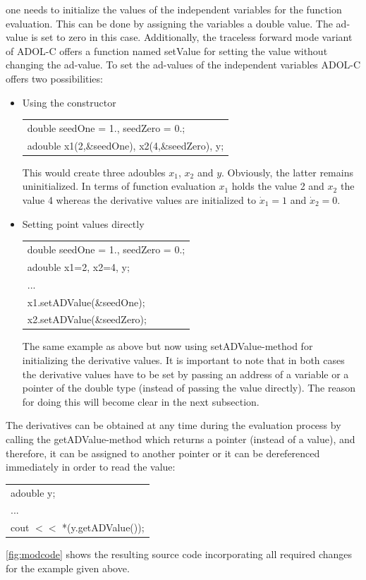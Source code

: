 \documentclass[11pt,twoside]{article}
\begin{document}
one needs to initialize the values of the independent variables for the
function evaluation. This can be done by assigning the variables a {\sf
double} value. The {\sf ad}-value is set to zero in this case. 
Additionally, the traceless forward mode variant of ADOL-C
offers a function named {\sf setValue} for setting the value without
changing the {\sf ad}-value. To set the {\sf ad}-values of the independent
variables ADOL-C offers two possibilities:
\begin{itemize}
  \item Using the constructor
        \begin{center}
	  \begin{tabular}{l}
        {\sf double seedOne = 1., seedZero = 0.;}\\
	    {\sf adouble x1(2,\&seedOne), x2(4,\&seedZero), y;}
	  \end{tabular}
	\end{center}
	This would create three adoubles $x_1$, $x_2$ and $y$. Obviously, the latter
	remains uninitialized. In terms of function evaluation
	$x_1$ holds the value 2 and $x_2$ the value 4 whereas the derivative values
	are initialized to $\dot{x}_1=1$ and $\dot{x}_2=0$.
   \item Setting point values directly
         \begin{center}
	   \begin{tabular}{l}
         {\sf double seedOne = 1., seedZero = 0.;}\\
	     {\sf adouble x1=2, x2=4, y;}\\
	     ...\\
	     {\sf x1.setADValue(\&seedOne);}\\
	     {\sf x2.setADValue(\&seedZero);}
	   \end{tabular}
	 \end{center}
	 The same example as above but now using {\sf setADValue}-method for initializing the derivative values. It is important to note that in both cases the derivative values have to be set by passing an address of a variable or a pointer of the {\sf double} type (instead of passing the value directly). The reason for doing this will become clear in the next subsection. 
\end{itemize}
%
The derivatives can be obtained at any time during the evaluation
process by calling the {\sf getADValue}-method which returns a pointer (instead of a value), and therefore, it can be assigned to another pointer or it can be dereferenced immediately in order to read the value:
\begin{center}
  \begin{tabular}{l}
    {\sf adouble y;}\\
    ...\\
    {\sf cout $<<$ *(y.getADValue());}
  \end{tabular}
\end{center}
\autoref{fig:modcode} shows the resulting source code incorporating
all required changes for the example
given above.
\end{document}
